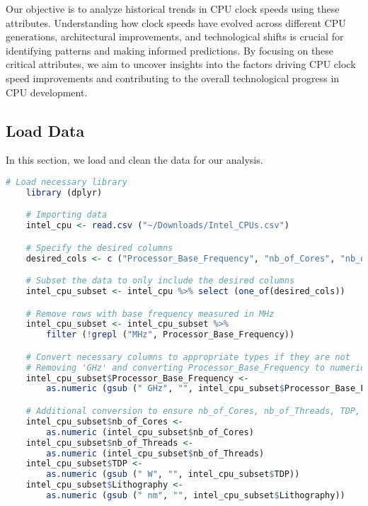 Our objective is to analyze historical trends in CPU clock speeds using these attributes. Understanding how clock speeds have evolved across different CPU generations, architectural improvements, and technological shifts is crucial for identifying patterns and making informed predictions. By focusing on these critical attributes, we aim to uncover insights into the factors driving CPU clock speed improvements and contributing to the overall technological progress in CPU development.

\subsection{Load Data}
In this section, we load and clean the data for our analysis.

\begin{lstlisting}[language=R]
    # Load necessary library
    library (dplyr)

    # Importing data
    intel_cpu <- read.csv ("~/Downloads/Intel_CPUs.csv")

    # Specify the desired columns
    desired_cols <- c ("Processor_Base_Frequency", "nb_of_Cores", "nb_of_Threads", "TDP", "Lithography")

    # Subset the data to only include the desired columns
    intel_cpu_subset <- intel_cpu %>% select (one_of(desired_cols))

    # Remove rows with base frequency measured in MHz
    intel_cpu_subset <- intel_cpu_subset %>%
        filter (!grepl ("MHz", Processor_Base_Frequency))

    # Convert necessary columns to appropriate types if they are not
    # Removing 'GHz' and converting Processor_Base_Frequency to numeric
    intel_cpu_subset$Processor_Base_Frequency <- 
        as.numeric (gsub (" GHz", "", intel_cpu_subset$Processor_Base_Frequency))

    # Additional conversion to ensure nb_of_Cores, nb_of_Threads, TDP, and Lithography are numeric where applicable
    intel_cpu_subset$nb_of_Cores <- 
        as.numeric (intel_cpu_subset$nb_of_Cores)
    intel_cpu_subset$nb_of_Threads <- 
        as.numeric (intel_cpu_subset$nb_of_Threads)
    intel_cpu_subset$TDP <- 
        as.numeric (gsub (" W", "", intel_cpu_subset$TDP))
    intel_cpu_subset$Lithography <- 
        as.numeric (gsub (" nm", "", intel_cpu_subset$Lithography))

\end{lstlisting}

\vspace*{1cm}

